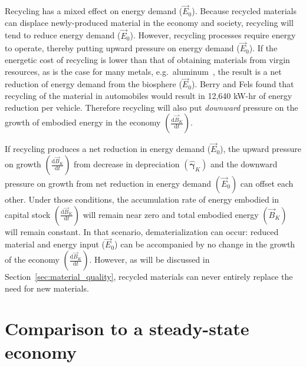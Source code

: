 Recycling has a mixed effect on energy demand ($\vec{E}_{0}$). 
Because recycled materials can displace newly-produced material 
in the economy and society, 
recycling will tend to reduce energy demand ($\vec{E}_{0}$). 
However, recycling processes require energy to operate, 
thereby putting upward pressure on energy demand ($\vec{E}_{0}$). 
If the energetic cost of recycling is lower than that of obtaining materials
from virgin resources, as is the case for many metals, 
e.g.\ aluminum~\cite{Chapman1975}, 
the result is a net reduction of energy demand 
from the biosphere ($\vec{E}_{0}$). 
Berry and Fels found that recycling of the material in automobiles
would result in 12,640 kW-hr of energy reduction per vehicle.\cite[p. 15]{Berry:1973vo}
Therefore recycling will also put \emph{downward} pressure on 
the growth of embodied energy in the economy
$\left(\frac{\mathrm{d}\vec{B}_{K}}{\mathrm{d}t}\right)$. 

If recycling produces a net reduction in energy demand ($\vec{E}_{0}$), 
the upward pressure on growth 
$\left(\frac{\mathrm{d}\vec{B}_{K}}{\mathrm{d}t}\right)$ 
from decrease in depreciation 
$\left(\hat{\boldsymbol{\gamma}}_{K}\right)$ 
and the downward pressure on growth 
from net reduction in energy demand 
$\left(\vec{E}_{0}\right)$ 
can offset each other.
Under those conditions, 
the accumulation rate of energy embodied in capital stock
$\left(\frac{\mathrm{d}\vec{B}_{K}}{\mathrm{d}t}\right)$ 
will remain near zero 
and total embodied energy 
$(\vec{B}_{K})$ will remain constant. 
In that scenario, 
dematerialization can occur: 
reduced material and energy input ($\vec{E}_{0}$) 
can be accompanied by 
no change in
the growth of the economy
$\left(\frac{\mathrm{d}\vec{B}_{K}}{\mathrm{d}t}\right)$.
However,
as will be discussed in Section~\ref{sec:material_quality},
recycled materials can never entirely replace
the need for new materials.

\section{Comparison to a steady-state economy}
\label{sec:SSE}

